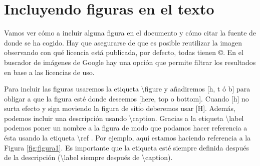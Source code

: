 


\section{Incluyendo figuras en el texto}


Vamos ver cómo a incluir alguna figura en el documento y cómo citar la fuente de donde se ha cogido. Hay que asegurarse de que es posible reutilizar la imagen observando con qué licencia está publicada, por defecto, todas tienen \copyright . En el buscador de imágenes de Google hay una opción que permite filtrar los resultados en base a las licencias de uso.

Para incluir las figuras usaremos la etiqueta \textbackslash figure y añadiremos [h, t ó b] para obligar a que la figura esté donde deseemos [here, top o bottom]. Cuando [h] no surta efecto y siga moviendo la figura de sitio deberemos usar [H]. Además, podemos incluir una descripción usando \textbackslash caption. Gracias a la etiqueta \textbackslash label podemos poner un nombre a la figura de modo que podamos hacer referencia a ésta usando la etiqueta \textbackslash ref . Por ejemplo, aquí estamos haciendo referencia a la Figura \ref{fig:figura1}. Es importante que la etiqueta esté siempre definida después de la descripción (\textbackslash label siempre después de  \textbackslash caption). 


